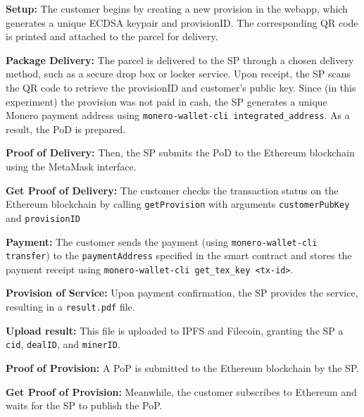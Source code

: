 \documentclass[pdftex,twocolumn,epjc3]{svjour3}
\begin{document}
\begin{enumerate}
  \setcounter{enumi}{-1}
  \item \textbf{Setup:} The customer begins by creating a new provision in the webapp, which generates a unique ECDSA keypair and provisionID. The corresponding QR code is printed and attached to the parcel for delivery.
  
  \item  \textbf{Package Delivery:}  The parcel is delivered to the SP through a chosen delivery method, such as a secure drop box or locker service. Upon receipt, the SP scans the QR code to retrieve the provisionID and customer's public key. Since (in this experiment) the provision was not paid in cash, the SP generates a unique Monero payment address using \texttt{monero-wallet-cli integrated\_address}. As a result, the PoD is prepared.

  \item \textbf{Proof of Delivery:} Then, the SP submits the PoD to the Ethereum blockchain using the MetaMask interface.

    \item \textbf{Get Proof of Delivery:} The customer checks the transaction status on the Ethereum blockchain by calling \texttt{getProvision} with arguments \texttt{customerPubKey} and \texttt{provisionID}

    \begin{sloppypar}
    \item \textbf{Payment:} The customer sends the payment (using \texttt{monero-wallet-cli transfer}) to the \texttt{paymentAddress} specified in the smart contract and stores the payment receipt using \texttt{monero-wallet-cli get\_tex\_key <tx-id>}.
    \end{sloppypar}
  
    \item \textbf{Provision of Service:} Upon payment confirmation, the SP provides the service, resulting in a \texttt{result.pdf} file.

  \item \textbf{Upload result:} This file is uploaded to IPFS and Filecoin, granting the SP a \texttt{cid}, \texttt{dealID}, and \texttt{minerID}.

  \item \textbf{Proof of Provision:} A PoP is submitted to the Ethereum blockchain by the SP.

    \item \textbf{Get Proof of Provision:} Meanwhile, the customer subscribes to Ethereum and waits for the SP to publish the PoP.



\end{enumerate}
\end{document}
